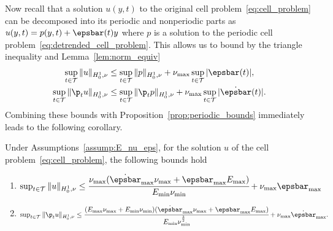 \documentclass[letterpaper,11pt]{article}
\begin{document}
Now recall that a solution $u(y, t)$ to the original cell problem~\eqref{eq:cell_problem} can be decomposed into its periodic and nonperiodic parts as $u(y, t) = p(y, t) + \epsbar(t)y$ where $p$ is a solution to the periodic cell problem~\eqref{eq:detrended_cell_problem}. This allows us to bound by the triangle inequality and Lemma~\ref{lem:norm_equiv}
\begin{equation}
\begin{gathered}
    \sup_{t \in \mathcal{T}}\|u\|_{H_0^1, \nu} \leq \sup_{t \in \mathcal{T}}\|p\|_{H_0^1, \nu} + \nu_{\max}\sup_{t \in \mathcal{T}}|\epsbar(t)|,\\
    \sup_{t \in \mathcal{T}}\|\p_tu\|_{H_0^1, \nu} \leq \sup_{t \in \mathcal{T}}\|\p_tp\|_{H_0^1, \nu} + \nu_{\max}\sup_{t \in \mathcal{T}}|\dot{\epsbar}(t)|.
\end{gathered}
\end{equation}
Combining these bounds with Proposition~\ref{prop:periodic_bounds} immediately leads to the following corollary.
\begin{corollary}\label{cor:u_bounds}
    Under Assumptions~\ref{assump:E_nu_eps}, for the solution $u$ of the cell problem~\eqref{eq:cell_problem}, the following bounds hold
    \begin{enumerate}[label=(\alph*)]
        \item $\sup_{t \in \mathcal{T}}\|u\|_{H_0^1, \nu} \leq \cfrac{\nu_{\max}(\dot{\epsbar}_{\max}\nu_{\max} + \epsbar_{\max}E_{\max})}{E_{\min}\nu_{\min}} + \nu_{\max}\epsbar_{\max}$
        \item $\sup_{t \in \mathcal{T}}\|\p_tu\|_{H_0^1, \nu} \leq \cfrac{(E_{\max}\nu_{\max} + E_{\min}\nu_{\min})(\dot{\epsbar}_{\max}\nu_{\max} + \epsbar_{\max}E_{\max})}{E_{\min}\nu_{\min}^\frac{3}{2}} + \nu_{\max}\dot{\epsbar}_{\max}.$
    \end{enumerate}
\end{corollary}
\end{document}

